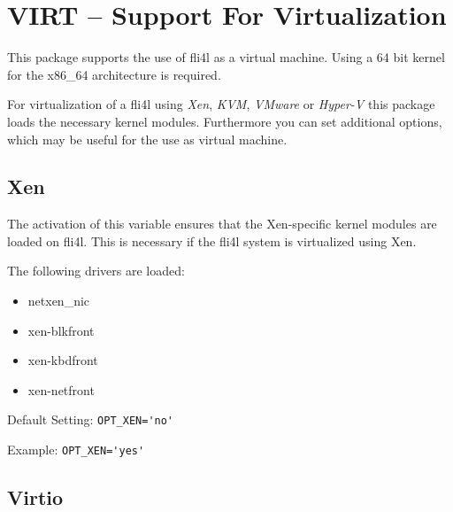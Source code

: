 
\section {VIRT -- Support For Virtualization}

This package supports the use of fli4l as a virtual machine. Using a 64
bit kernel for the x86\_64 architecture is required.

For virtualization of a fli4l using \emph{Xen}, \emph{KVM}, \emph{VMware} or \emph{Hyper-V} this package
loads the necessary kernel modules. Furthermore you can set additional options,
which may be useful for the use as virtual machine.

\subsection {Xen}

\begin{description}

The activation of this variable ensures that the Xen-specific kernel modules
are loaded on fli4l. This is necessary if the fli4l system is virtualized using Xen.

The following drivers are loaded:

\begin{itemize}
   \item netxen\_nic
   \item xen-blkfront
   \item xen-kbdfront
   \item xen-netfront
\end{itemize}

Default Setting: \verb+OPT_XEN='no'+

Example: \verb+OPT_XEN='yes'+

\end{description}

\subsection{Virtio}


